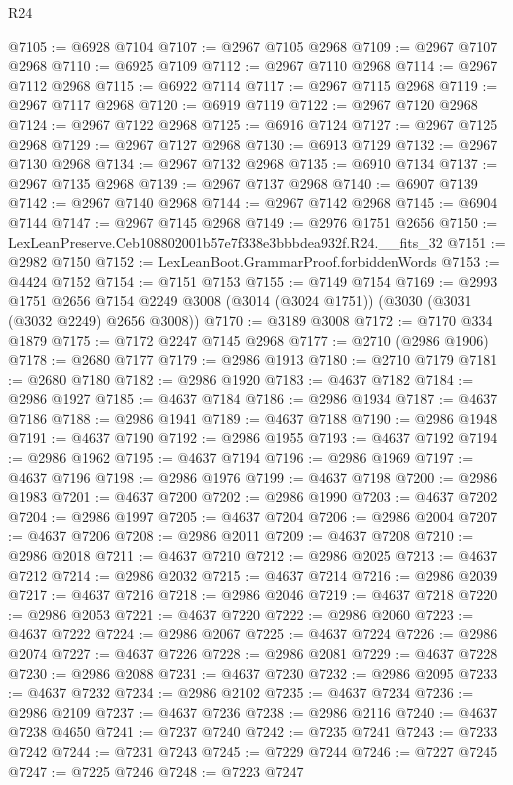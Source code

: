 \begin{lexlean}{R24}
\begin{coremodule}
@7105 := @6928 @7104
@7107 := @2967 @7105 @2968
@7109 := @2967 @7107 @2968
@7110 := @6925 @7109
@7112 := @2967 @7110 @2968
@7114 := @2967 @7112 @2968
@7115 := @6922 @7114
@7117 := @2967 @7115 @2968
@7119 := @2967 @7117 @2968
@7120 := @6919 @7119
@7122 := @2967 @7120 @2968
@7124 := @2967 @7122 @2968
@7125 := @6916 @7124
@7127 := @2967 @7125 @2968
@7129 := @2967 @7127 @2968
@7130 := @6913 @7129
@7132 := @2967 @7130 @2968
@7134 := @2967 @7132 @2968
@7135 := @6910 @7134
@7137 := @2967 @7135 @2968
@7139 := @2967 @7137 @2968
@7140 := @6907 @7139
@7142 := @2967 @7140 @2968
@7144 := @2967 @7142 @2968
@7145 := @6904 @7144
@7147 := @2967 @7145 @2968
@7149 := @2976 @1751 @2656
@7150 := LexLeanPreserve.Ceb108802001b57e7f338e3bbbdea932f.R24.__fits_32
@7151 := @2982 @7150
@7152 := LexLeanBoot.GrammarProof.forbiddenWords
@7153 := @4424 @7152
@7154 := @7151 @7153
@7155 := @7149 @7154
@7169 := @2993
    @1751
    @2656
    @7154
    @2249
    @3008
    (@3014 (@3024 @1751))
    (@3030 (@3031 (@3032 @2249) @2656 @3008))
@7170 := @3189 @3008
@7172 := @7170 @334 @1879
@7175 := @7172 @2247 @7145 @2968
@7177 := @2710 (@2986 @1906)
@7178 := @2680 @7177
@7179 := @2986 @1913
@7180 := @2710 @7179
@7181 := @2680 @7180
@7182 := @2986 @1920
@7183 := @4637 @7182
@7184 := @2986 @1927
@7185 := @4637 @7184
@7186 := @2986 @1934
@7187 := @4637 @7186
@7188 := @2986 @1941
@7189 := @4637 @7188
@7190 := @2986 @1948
@7191 := @4637 @7190
@7192 := @2986 @1955
@7193 := @4637 @7192
@7194 := @2986 @1962
@7195 := @4637 @7194
@7196 := @2986 @1969
@7197 := @4637 @7196
@7198 := @2986 @1976
@7199 := @4637 @7198
@7200 := @2986 @1983
@7201 := @4637 @7200
@7202 := @2986 @1990
@7203 := @4637 @7202
@7204 := @2986 @1997
@7205 := @4637 @7204
@7206 := @2986 @2004
@7207 := @4637 @7206
@7208 := @2986 @2011
@7209 := @4637 @7208
@7210 := @2986 @2018
@7211 := @4637 @7210
@7212 := @2986 @2025
@7213 := @4637 @7212
@7214 := @2986 @2032
@7215 := @4637 @7214
@7216 := @2986 @2039
@7217 := @4637 @7216
@7218 := @2986 @2046
@7219 := @4637 @7218
@7220 := @2986 @2053
@7221 := @4637 @7220
@7222 := @2986 @2060
@7223 := @4637 @7222
@7224 := @2986 @2067
@7225 := @4637 @7224
@7226 := @2986 @2074
@7227 := @4637 @7226
@7228 := @2986 @2081
@7229 := @4637 @7228
@7230 := @2986 @2088
@7231 := @4637 @7230
@7232 := @2986 @2095
@7233 := @4637 @7232
@7234 := @2986 @2102
@7235 := @4637 @7234
@7236 := @2986 @2109
@7237 := @4637 @7236
@7238 := @2986 @2116
@7240 := @4637 @7238 @4650
@7241 := @7237 @7240
@7242 := @7235 @7241
@7243 := @7233 @7242
@7244 := @7231 @7243
@7245 := @7229 @7244
@7246 := @7227 @7245
@7247 := @7225 @7246
@7248 := @7223 @7247

\end{coremodule}
\end{lexlean}
